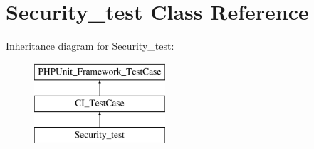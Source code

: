 \hypertarget{class_security__test}{}\section{Security\+\_\+test Class Reference}
\label{class_security__test}
Inheritance diagram for Security\+\_\+test\+:\begin{figure}[H]
\begin{center}
\leavevmode
\includegraphics[height=3.000000cm]{class_security__test}
\end{center}
\end{figure}
